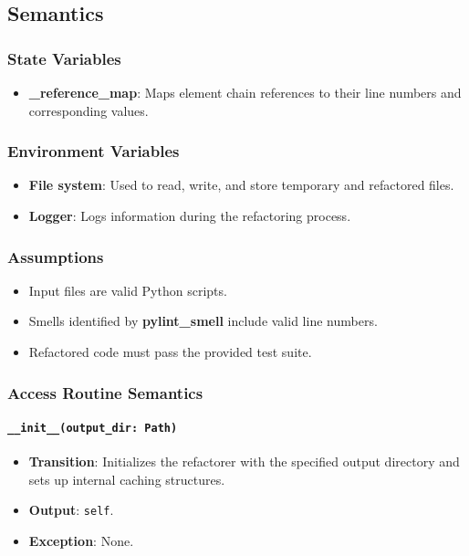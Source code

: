 \documentclass[12pt, titlepage]{article}
\begin{document}
\subsection{Semantics}

\subsubsection{State Variables}

\begin{itemize}
  \item \textbf{\_reference\_map}: Maps element chain references to their line numbers and corresponding values.
\end{itemize}

\subsubsection{Environment Variables}

\begin{itemize}
  \item \textbf{File system}: Used to read, write, and store temporary and refactored files.
  \item \textbf{Logger}: Logs information during the refactoring process.
\end{itemize}

\subsubsection{Assumptions}

\begin{itemize}
  \item Input files are valid Python scripts.
  \item Smells identified by \textbf{pylint\_smell} include valid line numbers.
  \item Refactored code must pass the provided test suite.
\end{itemize}

\subsubsection{Access Routine Semantics}

\paragraph{\texttt{\_\_init\_\_(output\_dir: Path)}}
\begin{itemize}
\item \textbf{Transition}: Initializes the refactorer with the specified output directory and sets up internal caching structures.
\item \textbf{Output}: \texttt{self}.
\item \textbf{Exception}: None.
\end{itemize}
\end{document}
